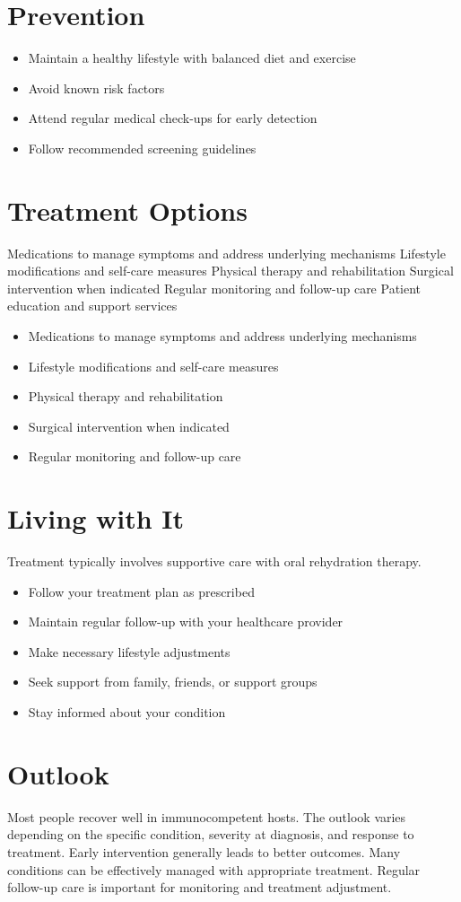 \section{Prevention}
\begin{itemize}[noitemsep]
  \item Maintain a healthy lifestyle with balanced diet and exercise
  \item Avoid known risk factors
  \item Attend regular medical check-ups for early detection
  \item Follow recommended screening guidelines
\end{itemize}
\section{Treatment Options}
Medications to manage symptoms and address underlying mechanisms Lifestyle modifications and self-care measures Physical therapy and rehabilitation Surgical intervention when indicated Regular monitoring and follow-up care Patient education and support services

\begin{itemize}[noitemsep]
  \item Medications to manage symptoms and address underlying mechanisms
  \item Lifestyle modifications and self-care measures
  \item Physical therapy and rehabilitation
  \item Surgical intervention when indicated
  \item Regular monitoring and follow-up care
\end{itemize}
\section{Living with It}
Treatment typically involves supportive care with oral rehydration therapy.

\begin{itemize}[noitemsep]
  \item Follow your treatment plan as prescribed
  \item Maintain regular follow-up with your healthcare provider
  \item Make necessary lifestyle adjustments
  \item Seek support from family, friends, or support groups
  \item Stay informed about your condition
\end{itemize}
\section{Outlook}
Most people recover well in immunocompetent hosts. The outlook varies depending on the specific condition, severity at diagnosis, and response to treatment. Early intervention generally leads to better outcomes. Many conditions can be effectively managed with appropriate treatment. Regular follow-up care is important for monitoring and treatment adjustment.
